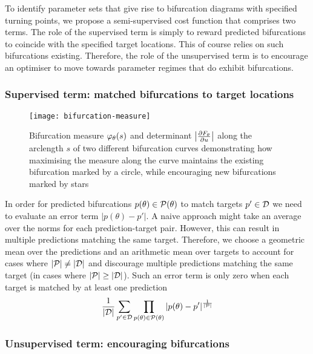 To identify parameter sets that give rise to bifurcation diagrams with specified turning points, we propose a semi-supervised cost function that comprises two terms. The role of the supervised term is simply to reward predicted bifurcations to coincide with the specified target locations. This of course relies on such bifurcations existing. Therefore, the role of the unsupervised term is to encourage an optimiser to move towards parameter regimes that do exhibit bifurcations.

\subsubsection{Supervised term: matched bifurcations to target locations}

\begin{figure}
    \centering
    \texttt{[image: bifurcation-measure]}
    \caption{Bifurcation measure $\varphi_{\theta}(s)$ and determinant $\left| \frac{\partial F_{\theta}}{\partial u} \right|$ along the arclength $s$ of two different bifurcation curves demonstrating how maximising the measure along the curve maintains the existing bifurcation marked by a circle, while encouraging new bifurcations marked by stars}
    \label{fig:measure}
\end{figure}

In order for predicted bifurcations $p(\theta)\in\mathcal{P}(\theta)$ to match targets $p'\in\mathcal{D}$ we need to evaluate an error term $|p(\theta)-p'|$. A naive approach might take an average over the norms for each prediction-target pair. However, this can result in multiple predictions matching the same target. Therefore, we choose a geometric mean over the predictions and an arithmetic mean over targets to account for cases where $|\mathcal{P}|\neq|\mathcal{D}|$ and discourage multiple predictions matching the same target (in cases where $|\mathcal{P}|\geq|\mathcal{D}|$). Such an error term is only zero when each target is matched by at least one prediction
\begin{align}
    \frac{1}{|\mathcal{D}|}\sum_{p'\in\mathcal{D}}
    \prod_{p(\theta)\in\mathcal{P}(\theta)}|p(\theta)-p'|
    ^{\frac{1}{|\mathcal{P}|}}
    \label{eq:error}
\end{align}

\subsubsection{Unsupervised term: encouraging bifurcations}

